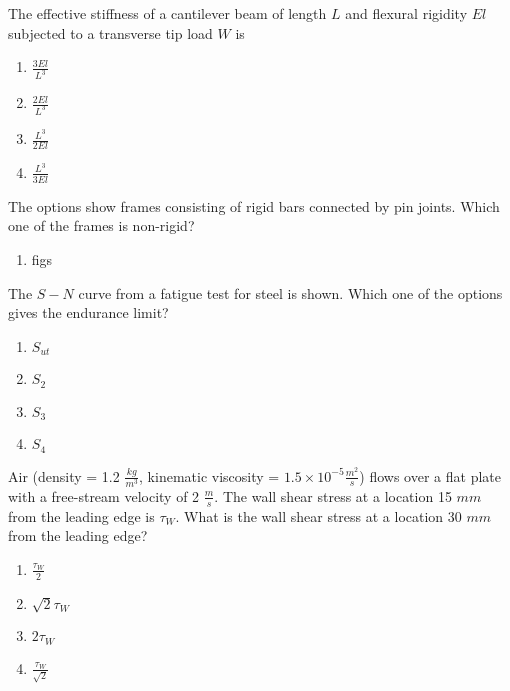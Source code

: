     \item 
    The effective stiffness of a cantilever beam of length $L$ and flexural rigidity $El$ subjected to a transverse tip load $W$ is

        
    \begin{enumerate}
        \item $\frac{3El}{L^3}$
        \item $\frac{2El}{L^3}$
        \item $\frac{L^3}{2El}$
        \item $\frac{L^3}{3El}$
    \end{enumerate}
    
    \item 
    The options show frames consisting of rigid bars connected by pin joints. Which one of the frames is non-rigid?
    \begin{enumerate}
        \item figs
    \end{enumerate}

    \item 
    The $S-N$ curve from a fatigue test for steel is shown. Which one of the options gives the endurance limit?


    \begin{enumerate}
        \item $S_{ut}$
        \item $S_{2}$
        \item $S_{3}$
        \item $S_{4}$
    \end{enumerate}

    \item 
    Air (density = 1.2 $\frac{kg}{m^3}$, kinematic viscosity = $1.5 \times 10^{-5}\frac{m^2}{s}$) flows over a flat plate with a free-stream velocity of 2 $\frac{m}{s}$. The wall shear stress at a location 15 $mm$ from the leading edge is $\tau_W$. What is the wall shear stress at a location 30 $mm$ from the leading edge?
    \begin{enumerate}
        \item $\frac{\tau_W}{2}$
        \item $\sqrt{2}\tau_W$
        \item $2\tau_W$
        \item $\frac{\tau_W}{\sqrt{2}}$
    \end{enumerate}

